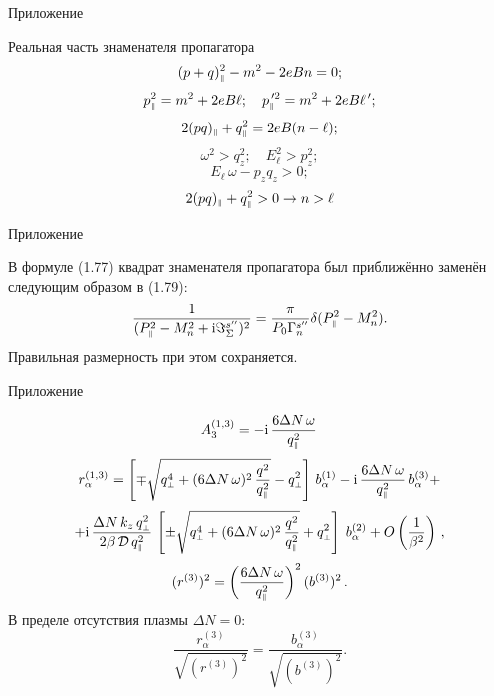 \documentclass{beamer}
\def\mprp{\mbox{\tiny $\bot$}}
\def\mprl{\mbox{\tiny $\|$}}
\newcommand{\ii}{\mathrm{i}}
\begin{document}
\begin{frame}{Приложение}
\begin{center}
Реальная часть знаменателя пропагатора
$$(p+q)^2_{\mprl}-m^2-2eBn = 0;$$
$$p^2_{\mprl} = m^2+2eB\ell; \quad p^{\,\prime 2}_{\mprl} = m^2+2eB\ell^{\,\prime};$$
$$2(pq)_{\mprl}+q^2_{\mprl}=2eB(n-\ell);$$
$$\omega^2 > q_z^2; \quad E_{\ell}^2 > p_z^2;$$
$$E_{\ell}\, \omega - p_z q_z >0;$$
$$2(pq)_{\mprl}+q^2_{\mprl} > 0 \to n>\ell$$
\end{center}
\end{frame}
\begin{frame}{Приложение}
\begin{center}
В формуле (1.77) квадрат знаменателя пропагатора был приближённо заменён следующим образом в (1.79):
$$\frac{1}{(P_{\mprl}^2-M_n^2+\ii \Im^{s''}_\Sigma)^2}  = \frac{\pi}{P_0\Gamma_n^{s''}}\delta(P_{\mprl}^2-M_n^2).$$
Правильная размерность при этом сохраняется.
\end{center}
\end{frame}
\begin{frame}{Приложение}
\begin{center}
$$A_3^{(1,3)} = - \ii \, \frac{6 \Delta N \, \omega}{q_{\mprl}^2} \,$$
%
$$r^{(1,3)}_{\alpha} = \left [\mp \sqrt{q^4_{\mprp} + 
(6 \Delta N \, \omega)^2\, \frac{q^2}{q_{\mprl}^2}}  - q^2_{\mprp} \right ]\, 
b^{(1)}_{\alpha} - \ii \, \frac{6 \Delta N \, \omega}{q_{\mprl}^2} \,  b^{(3)}_{\alpha} +$$
$$+ \ii \,\frac{\Delta N \, k_z \, q^2_{\mprp}}{2\beta \, {\cal D} \, q^2_{\mprl}}\, 
\left [\pm \sqrt{q^4_{\mprp} + 
(6 \Delta N \, \omega)^2\, \frac{q^2}{q_{\mprl}^2}} + q^2_{\mprp} \right ]\; b^{(2)}_{\alpha} + 
O \left (\frac{1}{\beta^2} \right) \, ,$$
$$(r^{(3)})^2 = \left (\frac{6 \Delta N \, \omega}{q_{\mprl}^2}\right )^2 (b^{(3)})^2\, .$$
%
В пределе отсутствия плазмы $\Delta N = 0$:
$$\frac{r_{\alpha}^{(3)}}{\sqrt{(r^{(3)})^2}} = \frac{b_{\alpha}^{(3)}}{\sqrt{(b^{(3)})^2}}.$$
\end{center}
\end{frame}
\end{document}

